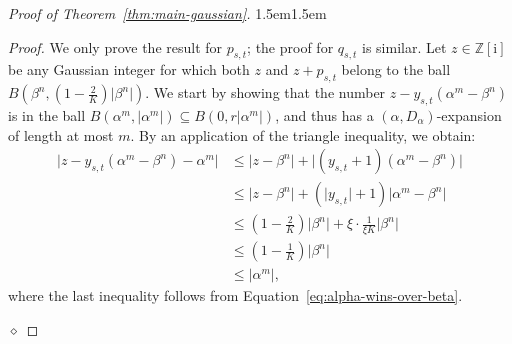\documentclass{amsart}
\newcommand{\Z}{\mathbb{Z}}
\newcommand{\ii}{\mathrm{i}}
\def\claimmargin{1.5em}
\newenvironment{claimproof}{\list{} {\rightmargin\claimmargin \leftmargin\claimmargin} \item[]\textit{Proof.}\hspace{1em}}{\hfill $\diamond$\endlist}
\newtheorem*{main theorem}{Theorem \ref{thm:main-gaussian}}
\theoremstyle{definition}
\begin{document}
\begin{proof}[Proof of Theorem~\ref{thm:main-gaussian}]

\begin{claimproof}
We only prove the result for $p_{s,t}$; the proof for $q_{s,t}$ is similar. Let $z\in\Z[\ii]$ be any Gaussian integer for which both $z$ and $z+p_{s,t}$ belong to the ball $B(\beta^n,(1-\frac{2}{K})\lvert\beta^n\rvert)$. We start by showing that the number $z-y_{s,t}(\alpha^m-\beta^n)$ is in the ball $B(\alpha^m,\lvert\alpha^m\rvert)\subseteq B(0,r\lvert\alpha^m\rvert)$, and thus has a $(\alpha, D_\alpha)$-expansion of length at most $m$. By an application of the triangle inequality, we obtain:
    \begin{align*}
        \lvert z-y_{s,t}(\alpha^m-\beta^n)-\alpha^m\rvert &\le \lvert z-\beta^n\rvert + \lvert(y_{s,t}+1)(\alpha^m - \beta^n)\rvert \\
        &\le \lvert z-\beta^n\rvert + (\lvert y_{s,t}\rvert + 1) \lvert \alpha^m - \beta^n\rvert \\
        &\le \left(1-\frac{2}{K}\right)\lvert\beta^n\rvert + \xi\cdot\frac{1}{\xi K}\lvert\beta^n\rvert \\
        & \le \left(1-\frac{1}{K}\right)\lvert\beta^n\rvert \\
        & \le \lvert\alpha^m\rvert,
    \end{align*}
    where the last inequality follows from Equation~\eqref{eq:alpha-wins-over-beta}.


\end{claimproof}
\end{proof}
\end{document}
